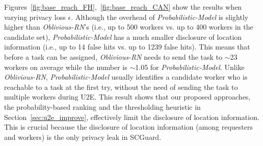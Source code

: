 \documentclass{USC-Thesis}
\numberwithin{equation}{chapter}
\begin{document}

Figures~\ref{fig:base_reach_FH},~\ref{fig:base_reach_CAN} show the results when varying privacy loss $\epsilon$.
Although the overhead of \emph{Probabilistic-Model} is slightly higher than \emph{Oblivious-RN}'s (i.e., up to 500 workers vs. up to 400 workers in the candidate set), \emph{Probabilistic-Model} has a much smaller disclosure of location information (i.e., up to 14 false hits vs. up to 1239 false hits). This means that before a task can be assigned, \emph{Oblivious-RN} needs to send the task to $\sim$23 workers on average while the number is $\sim$1.05 for \emph{Probabilistic-Model}. Unlike \emph{Oblivious-RN}, \emph{Probabilistic-Model} usually identifies a candidate worker who is reachable to a task at the first try, without the need of sending the task to multiple workers during U2E. This result shows that our proposed approaches, the probability-based ranking and the thresholding heuristic in Section~\ref{sec:u2e_improve}, effectively limit the disclosure of location information.
This is crucial because the disclosure of location information (among requesters and workers) is the only privacy leak in SCGuard.
\end{document}
